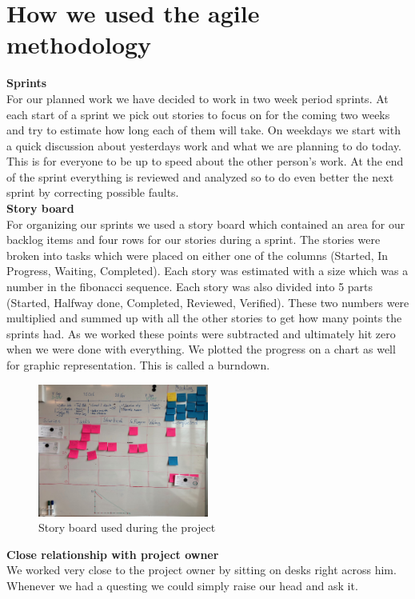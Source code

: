 \section{How we used the agile methodology}
\label{subSec:howweused}
\textbf{Sprints} \\
For our planned work we have decided to work in two week period sprints. At each start of a sprint we pick out stories to focus on for the coming two weeks and try to estimate how long each of them will take.
On weekdays we start with a quick discussion about yesterdays work and what we are planning to do today. This is for everyone to be up to speed about the other person's work.
At the end of the sprint everything is reviewed and analyzed so to do even better the next sprint by correcting possible faults.\\

\noindent
\textbf{Story board} \\
For organizing our sprints we used a story board which contained an area for our backlog items and four rows for our stories during a sprint. The stories were broken into tasks which were placed on either one of the columns (Started, In Progress, Waiting, Completed).
Each story was estimated with a size which was a number in the fibonacci sequence. Each story was also divided into 5 parts (Started, Halfway done, Completed, Reviewed, Verified). These two numbers were multiplied and summed up with all the other stories to get how many points the sprints had. As we worked these points were subtracted and ultimately hit zero when we were done with everything. We plotted the progress on a chart as well for graphic representation. This is called a burndown.

\begin{figure}[hbtp]
\begin{center}
\includegraphics[width = 0.5\textwidth]{./Images/story_board.jpg} 
\caption{Story board used during the project}
\end{center}
\end{figure}

\noindent
\textbf{Close relationship with project owner} \\
We worked very close to the project owner by sitting on desks right across him. Whenever we had a questing we could simply raise our head and ask it.

\newpage